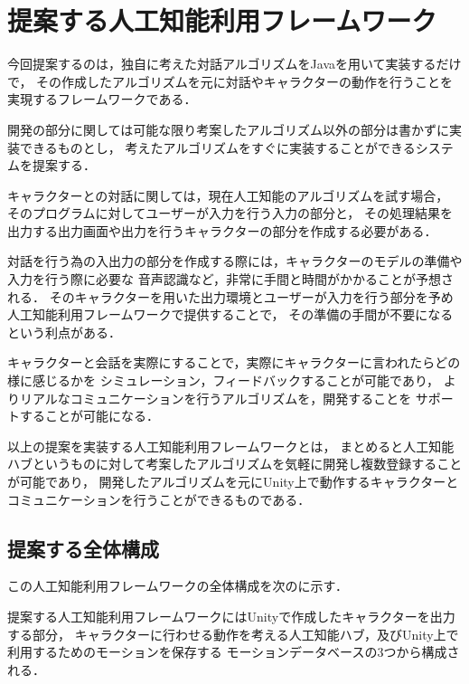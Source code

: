 
\section{提案する人工知能利用フレームワーク}
今回提案するのは，独自に考えた対話アルゴリズムをJavaを用いて実装するだけで，
その作成したアルゴリズムを元に対話やキャラクターの動作を行うことを実現するフレームワークである．

開発の部分に関しては可能な限り考案したアルゴリズム以外の部分は書かずに実装できるものとし，
考えたアルゴリズムをすぐに実装することができるシステムを提案する．

キャラクターとの対話に関しては，現在人工知能のアルゴリズムを試す場合，
そのプログラムに対してユーザーが入力を行う入力の部分と，
その処理結果を出力する出力画面や出力を行うキャラクターの部分を作成する必要がある．

対話を行う為の入出力の部分を作成する際には，キャラクターのモデルの準備や入力を行う際に必要な
音声認識など，非常に手間と時間がかかることが予想される．
そのキャラクターを用いた出力環境とユーザーが入力を行う部分を予め人工知能利用フレームワークで提供することで，
その準備の手間が不要になるという利点がある．

キャラクターと会話を実際にすることで，実際にキャラクターに言われたらどの様に感じるかを
シミュレーション，フィードバックすることが可能であり，
よりリアルなコミュニケーションを行うアルゴリズムを，開発することを
サポートすることが可能になる．

以上の提案を実装する人工知能利用フレームワークとは，
まとめると人工知能ハブというものに対して考案したアルゴリズムを気軽に開発し複数登録することが可能であり，
開発したアルゴリズムを元にUnity上で動作するキャラクターとコミュニケーションを行うことができるものである．
\subsection{提案する全体構成}\label{sec:allAr}
この人工知能利用フレームワークの全体構成を次のに示す．


提案する人工知能利用フレームワークにはUnityで作成したキャラクターを出力する部分，
キャラクターに行わせる動作を考える人工知能ハブ，及びUnity上で利用するためのモーションを保存する
モーションデータベースの3つから構成される．

